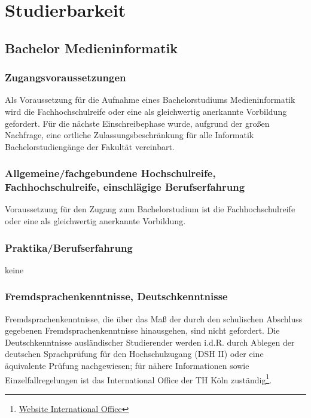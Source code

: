 \chapter{Studierbarkeit}\label{studierbarkeit}

\section{Bachelor
Medieninformatik}\label{bachelor-medieninformatik-1}

\subsection{Zugangsvoraussetzungen}\label{zugangsvoraussetzungen}

Als Voraussetzung für die Aufnahme eines Bachelorstudiums
Medieninformatik wird die Fachhochschulreife oder eine als gleichwertig
anerkannte Vorbildung gefordert. Für die nächste Einschreibephase wurde,
aufgrund der großen Nachfrage, eine ortliche Zulassungsbeschränkung für
alle Informatik Bachelorstudiengänge der Fakultät vereinbart.

\subsection{Allgemeine/fachgebundene Hochschulreife,
Fachhochschulreife, einschlägige
Berufserfahrung}\label{allgemeinefachgebundene-hochschulreife-fachhochschulreife-einschluxe4gige-berufserfahrung}

Voraussetzung für den Zugang zum Bachelorstudium ist die
Fachhochschulreife oder eine als gleichwertig anerkannte Vorbildung.

\subsection{Praktika/Berufserfahrung}\label{praktikaberufserfahrung}

keine

\subsection{Fremdsprachenkenntnisse,
Deutschkenntnisse}\label{fremdsprachenkenntnisse-deutschkenntnisse}

Fremdsprachenkenntnisse, die über das Maß der durch den schulischen
Abschluss gegebenen Fremdsprachenkenntnisse hinausgehen, sind nicht
gefordert. Die Deutschkenntnisse ausländischer Studierender werden
i.d.R. durch Ablegen der deutschen Sprachprüfung für den Hochschulzugang
(DSH II) oder eine äquivalente Prüfung nachgewiesen; für nähere
Informationen sowie Einzelfallregelungen ist das International Office
der TH Köln zuständig\footnote{\href{https://www.th-koeln.de/internationales/international-office_1986.php}{Website
  International Office}}.


